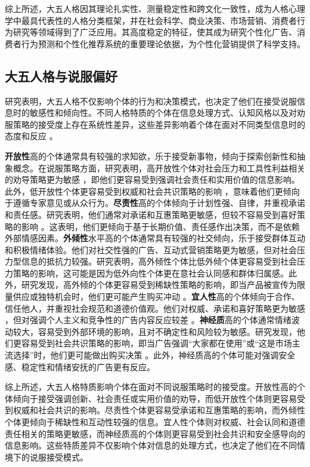 综上所述，大五人格因其理论扎实性、测量稳定性和跨文化一致性，成为人格心理学中最具代表性的人格分类框架，并在社会科学、商业决策、市场营销、消费者行为研究等领域得到了广泛应用。其高度稳定的特征，使其成为研究个性化广告、消费者行为预测和个性化推荐系统的重要理论依据，为个性化营销提供了科学支持。

\subsection{大五人格与说服偏好}

研究表明，大五人格不仅影响个体的行为和决策模式，也决定了他们在接受说服信息时的敏感性和倾向性。不同人格特质的个体在信息处理方式、认知风格以及对劝服策略的接受度上存在系统性差异，这些差异影响着个体在面对不同类型信息时的态度和反应 \citep[例如][]{alkics2015impact}。

\textbf{开放性}高的个体通常具有较强的求知欲，乐于接受新事物，倾向于探索创新性和抽象概念。在说服策略方面，研究表明，高开放性个体对社会压力和工具性利益相关的劝导策略更为敏感 \citep{gerber2013big}，即他们更容易受到强调社会责任和实用价值的信息影响。此外，低开放性个体更容易受到权威和社会共识策略的影响 \citep{oyibo2017investigation}，意味着他们更倾向于遵循专家意见或从众行为。\textbf{尽责性}高的个体倾向于计划性强、自律，并重视承诺和责任感。研究表明，他们通常对承诺和互惠策略更敏感，但较不容易受到喜好策略的影响 \citep{oyibo2017investigation}。这表明，他们更倾向于基于长期价值、责任感作出决策，而不是依赖外部情感因素。\textbf{外倾性}水平高的个体通常具有较强的社交倾向，乐于接受群体互动和积极情绪体验。他们对社交性强的广告、互动式营销策略更为敏感，但对社会压力型信息的抵抗力较强。研究表明，高外倾性个体比低外倾个体更容易受到社会压力策略的影响，这可能是因为低外向性个体更在意社会认同感和群体归属感。此外，研究发现，高外倾的个体更容易受到稀缺性策略的影响，即当产品被宣传为限量供应或独特机会时，他们更可能产生购买冲动 \citep{wall2019personality}。\textbf{宜人性}高的个体倾向于合作、信任他人，并重视社会规范和道德价值观。他们对权威、承诺和喜好策略更为敏感 \citep{oyibo2017investigation}，但对强调个人主义和竞争性的广告内容反应较差 \citep{gerber2013big}。\textbf{神经质}高的个体通常情绪波动较大，容易受到外部环境的影响，且对不确定性和风险较为敏感。研究发现，他们更容易受到社会共识策略的影响，即当广告强调“大家都在使用”或“这是市场主流选择”时，他们更可能做出购买决策 \citep{wall2019personality}。此外，神经质高的个体可能对强调安全感、稳定性和情绪安抚的广告更有反应。

综上所述，大五人格特质影响个体在面对不同说服策略时的接受度。开放性高的个体倾向于接受强调创新、社会责任或实用价值的劝导，而低开放性个体则更容易受到权威和社会共识的影响。尽责性个体更容易受承诺和互惠策略的影响，而外倾性个体更倾向于稀缺性和互动性较强的信息。宜人性个体则对权威、社会认同和道德责任相关的策略更敏感，而神经质高的个体则更容易受到社会共识和安全感导向的信息影响。这些特质差异不仅影响个体对信息的处理方式，也决定了他们在不同情境下的说服接受模式。


